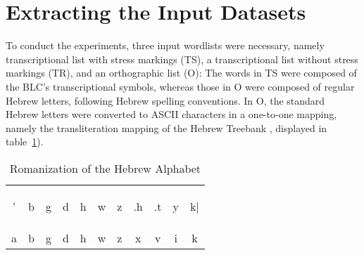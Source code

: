 \section{Extracting the Input Datasets}\label{sec:extr}
To conduct the experiments, three input wordlists were necessary, 
namely transcriptional list with stress markings (TS), a transcriptional list without stress markings  (TR), and an orthographic list (O):
The words in TS were composed of the \ac{BLC}'s transcriptional symbols, 
whereas those in O
were composed of regular Hebrew letters, following Hebrew spelling conventions. 
In O, the standard Hebrew letters were converted to ASCII characters in a one-to-one
mapping, namely the transliteration mapping of the Hebrew Treebank 
\citep{simaan-et-al:2001}, displayed in table~\ref{tab:ortho-alph}). %
\begin{table}[ht]
\centering
\caption{Romanization of the Hebrew Alphabet \citep{simaan-et-al:2001}}
\label{tab:ortho-alph}
\setlength{\extrarowheight}{8pt}
\begin{tabular}{c c c c c c c c c c c}
\hline %
\begin{cjhebrew}'\end{cjhebrew} & \begin{cjhebrew}b\end{cjhebrew} & \begin{cjhebrew}g\end{cjhebrew} & \begin{cjhebrew}d\end{cjhebrew} 
& \begin{cjhebrew}h\end{cjhebrew} & \begin{cjhebrew}w\end{cjhebrew} & \begin{cjhebrew}z\end{cjhebrew}& \begin{cjhebrew}.h\end{cjhebrew}
& \begin{cjhebrew}.t\end{cjhebrew} & \begin{cjhebrew}y\end{cjhebrew} & \begin{cjhebrew}k|\end{cjhebrew} \\ 
a & b & g & d 
& h & w & z & x & v & i & k \\[12pt]

\end{tabular}
\end{table}
